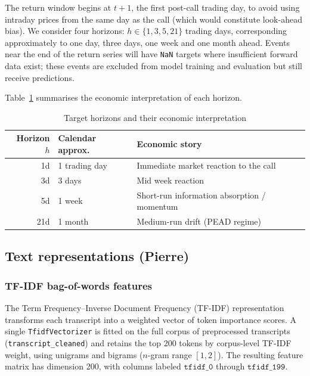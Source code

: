 \documentclass{article}
\begin{document}
The return window begins at $t+1$, the first post-call trading day, to avoid using intraday prices from the same day as the call (which would constitute look-ahead bias). We consider four horizons: $h \in \{1, 3, 5, 21\}$ trading days, corresponding approximately to one day, three days, one week and one month ahead. Events near the end of the return series will have \texttt{NaN} targets where insufficient forward data exist; these events are excluded from model training and evaluation but still receive predictions.

Table~\ref{tab:horizons} summarises the economic interpretation of each horizon.

\begin{table}[H]
\centering
\caption{Target horizons and their economic interpretation}
\label{tab:horizons}
\begin{tabular}{rll}
\toprule
\textbf{Horizon $h$} & \textbf{Calendar approx.} & \textbf{Economic story} \\
\midrule
1d  & 1 trading day  & Immediate market reaction to the call \\
3d & 3 days      & Mid week reaction \\
5d  & 1 week         & Short-run information absorption / momentum \\
21d & 1 month        & Medium-run drift (PEAD regime) \\
\bottomrule
\end{tabular}
\end{table}

\subsection{Text representations (Pierre)}

\subsubsection{TF-IDF bag-of-words features}

The Term Frequency--Inverse Document Frequency (TF-IDF) representation transforms each transcript into a weighted vector of token importance scores. A single \texttt{TfidfVectorizer} is fitted on the full corpus of preprocessed transcripts (\texttt{transcript\_cleaned}) and retains the top 200 tokens by corpus-level TF-IDF weight, using unigrams and bigrams ($n$-gram range $[1, 2]$). The resulting feature matrix has dimension 200, with columns labeled $\mathtt{tfidf\_0}$ through $\mathtt{tfidf\_199}$.
\end{document}

